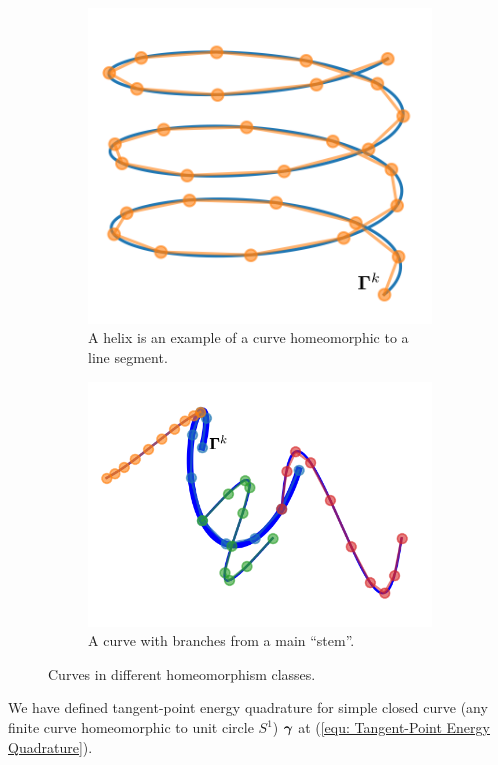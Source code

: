\documentclass[../dissertation.tex]{subfiles}
\begin{document}
\begin{figure}[tpb]
    \centering
    \begin{subfigure}[b]{0.4\textwidth}
        \centering
        \includegraphics[width=\textwidth]{sections/otherHomeomorphismImgs/linesegment}
        \caption{A helix is an example of a curve homeomorphic to a line segment.}
        \label{fig: Line Segment Homeomorphism Class}
    \end{subfigure}
    \hspace{1cm}
    \begin{subfigure}[b]{0.4\textwidth}
        \centering
        \includegraphics[width=\textwidth]{sections/otherHomeomorphismImgs/branch}
        \caption{A curve with branches from a main ``stem''.}
        \label{fig: Bus Network}
    \end{subfigure}
    \caption{Curves in different homeomorphism classes.}
\end{figure}
We have defined tangent-point energy quadrature for simple closed curve (any finite curve homeomorphic to unit circle $S^1$) $\boldsymbol{\gamma}$ at (\ref{equ: Tangent-Point Energy Quadrature}).
\end{document}
